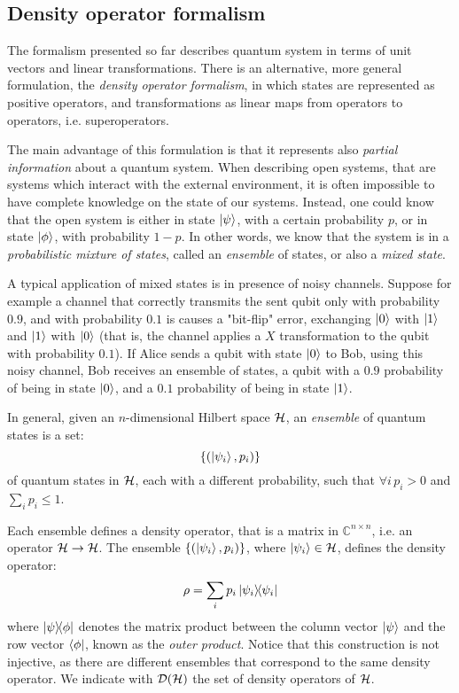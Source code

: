 \subsection{Density operator formalism}

The formalism presented so far describes quantum system in terms of unit vectors and linear transformations. There is an alternative, more general formulation, the \textit{density operator formalism}, in which states are represented as positive operators, and transformations as linear maps from operators to operators, i.e. superoperators.

The main advantage of this formulation is that it represents also \textit{partial information} about a quantum system. When describing open systems, that are systems which interact with the external environment, it is often impossible to have complete knowledge on the state of our systems. Instead, one could know that the open system is either in state $\ket{\psi}$, with a certain probability $p$, or in state $\ket{\phi}$, with probability $1-p$. In other words, we know that the system is in a \textit{probabilistic mixture of states}, called an \textit{ensemble} of states, or also a \textit{mixed state}.

A typical application of mixed states is in presence of noisy channels. Suppose for example a channel that correctly transmits the sent qubit only with probability $0.9$, and with probability $0.1$ is causes a "bit-flip" error, exchanging $\ket{0}$ with $\ket{1}$ and $\ket{1}$ with $\ket{0}$ (that is, the channel applies a $X$ transformation to the qubit with probability $0.1$). If Alice sends a qubit with state $\ket{0}$ to Bob, using this noisy channel, Bob receives an ensemble of states, a qubit with a $0.9$ probability of being in state $\ket{0}$, and a $0.1$ probability of being in state $\ket{1}$.


In general, given an $n$-dimensional Hilbert space $\mathcal{H}$, an \textit{ensemble} of quantum states is a set:
\[\{(\ket{\psi_i}, p_i)\} \]
of quantum states in $\mathcal{H}$, each with a different probability, such that $\forall i \, p_i > 0$ and $\sum_i p_i \leq 1$.

Each ensemble defines a density operator, that is a matrix in $\mathbb{C}^{n \times n}$, i.e. an operator $\mathcal{H} \rightarrow \mathcal{H}$. The ensemble $\{(\ket{\psi_i}, p_i)\}$, where $\ket{\psi_i} \in \mathcal{H}$, defines the density operator: 
\[
	\rho = \sum_i p_i \ket{\psi_i}\!\!\bra{\psi_i}
\]
where $\ket{\psi}\!\!\bra{\phi}$ denotes the matrix product between the column vector $\ket{\psi}$ and the row vector $\bra{\phi}$, known as the \textit{outer product}. Notice that this construction is not injective, as there are different ensembles that correspond to the same density operator. We indicate with $\mathcal{D}(\mathcal{H})$ the set of density operators of $\mathcal{H}$.

